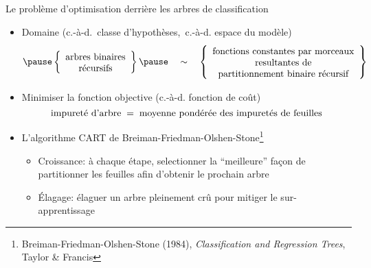 

\begin{frame}{\vskip -0.4cm \large Le probl\`eme d'optimisation derri\`ere les arbres de classification}

\large
\begin{itemize}
\item
	\vskip -0.2cm
	\pause
	Domaine ({\small c.-\`a-d. \,classe d'hypoth\`eses,\, c.-\`a-d. espace du mod\`ele})
	\vskip -0.1cm
	{\scriptsize\begin{equation*}
	\pause
	\left\{\begin{array}{c}
		\overset{{\color{white}.}}{\textnormal{arbres binaires}} \\
		\textnormal{r\'ecursifs}
	\end{array}\right\}
	\pause
	\quad\sim\quad
	\left\{\begin{array}{c}
		\overset{{\color{white}.}}{\textnormal{fonctions constantes par morceaux}} \\
		\textnormal{resultantes de} \\
		\textnormal{partitionnement binaire r\'ecursif}
	\end{array}\right\}
	\end{equation*}}

\item
	\pause
	Minimiser la fonction objective ({\small c.-\`a-d.} fonction de co\^ut)
	\pause
	\vskip -0.5cm
	{\small\begin{equation*}
	\textnormal{impuret\'e d'arbre}
	\;=\;
		\textnormal{moyenne pond\'er\'ee des impuret\'es de feuilles}
	\end{equation*}}

\item
	\pause
	\vskip -0.2cm
	L'algorithme CART de Breiman-Friedman-Olshen-Stone\!\!\footnote{\tiny Breiman-Friedman-Olshen-Stone (1984),
	\textit{{\color{red}C}lassification {\color{red}a}nd {\color{red}R}egression {\color{red}T}rees},
	Taylor \& Francis}
	\begin{itemize}
	\item
		\pause
		{\footnotesize Croissance: \`a chaque \'etape, selectionner la ``meilleure'' fa\c{c}on
		de partitionner les feuilles afin d'obtenir le prochain arbre}
	\item
		\pause
		{\footnotesize \'Elagage: \'elaguer un arbre pleinement cr\^u pour mitiger le sur-apprentissage}
	\end{itemize}
\end{itemize}

\end{frame}
\normalsize

